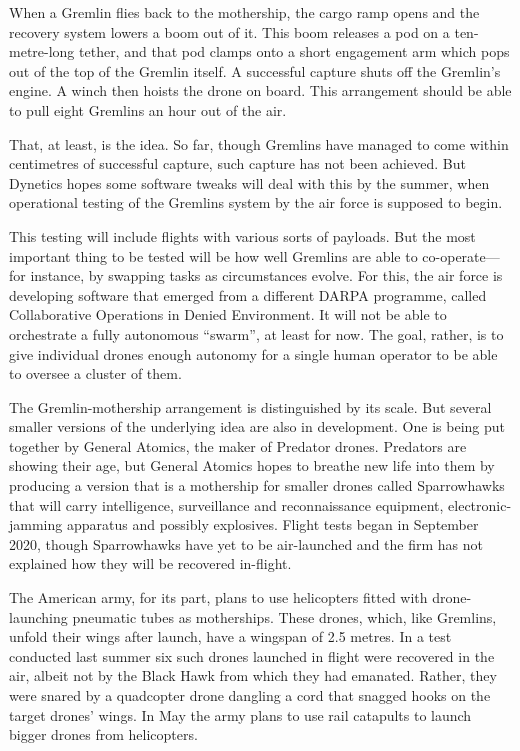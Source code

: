 \documentclass{article}
\begin{document}
When a Gremlin flies back to the mothership, the cargo ramp opens and the recovery system lowers a boom out of it. This boom releases a pod on a ten-metre-long tether, and that pod clamps onto a short engagement arm which pops out of the top of the Gremlin itself. A successful capture shuts off the Gremlin's engine. A winch then hoists the drone on board. This arrangement should be able to pull eight Gremlins an hour out of the air. 

That, at least, is the idea. So far, though Gremlins have managed to come within centimetres of successful capture, such capture has not been achieved. But Dynetics hopes some software tweaks will deal with this by the summer, when operational testing of the Gremlins system by the air force is supposed to begin. 

This testing will include flights with various sorts of payloads. But the most important thing to be tested will be how well Gremlins are able to co-operate---for instance, by swapping tasks as circumstances evolve. For this, the air force is developing software that emerged from a different DARPA programme, called Collaborative Operations in Denied Environment. It will not be able to orchestrate a fully autonomous ``swarm'', at least for now. The goal, rather, is to give individual drones enough autonomy for a single human operator to be able to oversee a cluster of them. 

The Gremlin-mothership arrangement is distinguished by its scale. But several smaller versions of the underlying idea are also in development. One is being put together by General Atomics, the maker of Predator drones. Predators are showing their age, but General Atomics hopes to breathe new life into them by producing a version that is a mothership for smaller drones called Sparrowhawks that will carry intelligence, surveillance and reconnaissance equipment, electronic-jamming apparatus and possibly explosives. Flight tests began in September 2020, though Sparrowhawks have yet to be air-launched and the firm has not explained how they will be recovered in-flight. 

The American army, for its part, plans to use helicopters fitted with drone-launching pneumatic tubes as motherships. These drones, which, like Gremlins, unfold their wings after launch, have a wingspan of 2.5 metres. In a test conducted last summer six such drones launched in flight were recovered in the air, albeit not by the Black Hawk from which they had emanated. Rather, they were snared by a quadcopter drone dangling a cord that snagged hooks on the target drones' wings. In May the army plans to use rail catapults to launch bigger drones from helicopters. 
\end{document}
